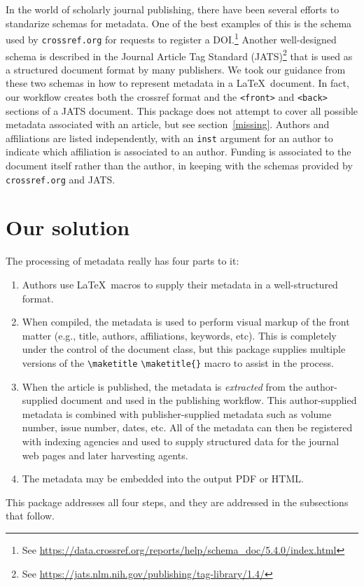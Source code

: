 \documentclass{article}
\newcommand{\cmd}[2][]{%
  \def\FirstArg{#1}%
  \ifx\FirstArg\empty%
    \texttt{\textbackslash{}#2}%
  \else%
    \texttt{\textbackslash{}#2\{#1\}}%
  \fi
}
\begin{document}
In the world of scholarly journal publishing, there have been several efforts to
standarize schemas for metadata. One of the best examples
of this is the schema used by \texttt{crossref.org} for requests to
register a DOI.\footnote{See
\url{https://data.crossref.org/reports/help/schema_doc/5.4.0/index.html}}
Another well-designed schema is described in the Journal Article Tag
Standard
(JATS)\footnote{See \url{https://jats.nlm.nih.gov/publishing/tag-library/1.4/}}
that is used as a structured document format by many publishers. We
took our guidance from these two schemas in how to represent metadata
in a \LaTeX\ document. In fact, our workflow creates both the crossref
format and the \texttt{<front>} and \texttt{<back>} sections of a JATS
document.  This package does not attempt to cover all possible
metadata associated with an article, but see
section~\ref{missing}. Authors and affiliations are listed
independently, with an \texttt{inst} argument for an author to indicate which
affiliation is associated to an author. Funding is associated to the
document itself rather than the author, in keeping with the schemas
provided by \texttt{crossref.org} and JATS.

\section{Our solution}
The processing of metadata really has four parts to it:
\begin{enumerate}
\item \label{supply}Authors use \LaTeX\ macros to supply their metadata in a well-structured format.
\item \label{markup}When compiled, the metadata is used to perform visual markup of
the front matter (e.g., title, authors, affiliations, keywords, etc). This is completely under
the control of the document class, but this package supplies multiple versions of the
\cmd{maketitle} macro to assist in the process.
\item \label{extract}When the article is published, the metadata is {\em extracted}
from the author-supplied document and used in the publishing workflow. This author-supplied
metadata is combined with publisher-supplied metadata such as volume number,
issue number, dates, etc.
All of the metadata can then be registered with indexing agencies and used to supply 
structured data for the journal web pages and later harvesting agents.
\item \label{xmp} The metadata may be embedded into the output PDF or HTML.
\end{enumerate}
This package addresses all four steps, and they are addressed in the subsections that follow.
\end{document}
